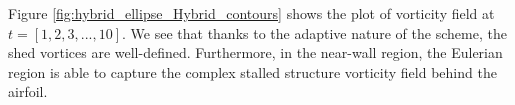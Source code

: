 

%
%


Figure \ref{fig:hybrid_ellipse_Hybrid_contours} shows the plot of vorticity field at $t=[1,2,3,...,10]$. We see that thanks to the adaptive nature of the scheme, the shed vortices are well-defined. Furthermore, in the near-wall region, the Eulerian region is able to capture the complex stalled structure vorticity field behind the airfoil.
	
